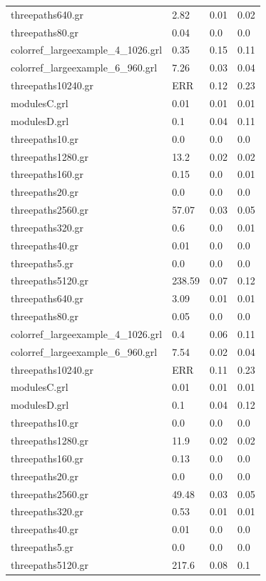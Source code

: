 \documentclass[11pt]{article}
\begin{document}
\begin{table}[h!]
\begin{tabularx}{\textwidth}{|l|X|X|X|}
		threepaths640.gr & 2.82 & 0.01 & 0.02 \\
		threepaths80.gr & 0.04 & 0.0 & 0.0 \\
		colorref\_largeexample\_4\_1026.grl & 0.35 & 0.15 & 0.11 \\
		colorref\_largeexample\_6\_960.grl & 7.26 & 0.03 & 0.04 \\
		threepaths10240.gr & ERR & 0.12 & 0.23 \\
		modulesC.grl & 0.01 & 0.01 & 0.01 \\
		modulesD.grl & 0.1 & 0.04 & 0.11 \\
		threepaths10.gr & 0.0 & 0.0 & 0.0 \\
		threepaths1280.gr & 13.2 & 0.02 & 0.02 \\
		threepaths160.gr & 0.15 & 0.0 & 0.01 \\
		threepaths20.gr & 0.0 & 0.0 & 0.0 \\
		threepaths2560.gr & 57.07 & 0.03 & 0.05 \\
		threepaths320.gr & 0.6 & 0.0 & 0.01 \\
		threepaths40.gr & 0.01 & 0.0 & 0.0 \\
		threepaths5.gr & 0.0 & 0.0 & 0.0 \\
		threepaths5120.gr & 238.59 & 0.07 & 0.12 \\
		threepaths640.gr & 3.09 & 0.01 & 0.01 \\
		threepaths80.gr & 0.05 & 0.0 & 0.0 \\
		colorref\_largeexample\_4\_1026.grl & 0.4 & 0.06 & 0.11 \\
		colorref\_largeexample\_6\_960.grl & 7.54 & 0.02 & 0.04 \\
		threepaths10240.gr & ERR & 0.11 & 0.23 \\
		modulesC.grl & 0.01 & 0.01 & 0.01 \\
		modulesD.grl & 0.1 & 0.04 & 0.12 \\
		threepaths10.gr & 0.0 & 0.0 & 0.0 \\
		threepaths1280.gr & 11.9 & 0.02 & 0.02 \\
		threepaths160.gr & 0.13 & 0.0 & 0.0 \\
		threepaths20.gr & 0.0 & 0.0 & 0.0 \\
		threepaths2560.gr & 49.48 & 0.03 & 0.05 \\
		threepaths320.gr & 0.53 & 0.01 & 0.01 \\
		threepaths40.gr & 0.01 & 0.0 & 0.0 \\
		threepaths5.gr & 0.0 & 0.0 & 0.0 \\
		threepaths5120.gr & 217.6 & 0.08 & 0.1 \\

\end{tabularx}
\end{table}
\end{document}
